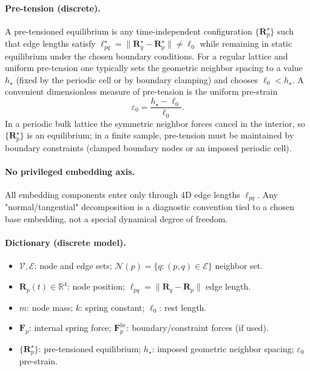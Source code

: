 \paragraph{Pre-tension (discrete).}
A pre-tensioned equilibrium is any time-independent configuration $\{\mathbf R^\star_p\}$ such that edge lengths satisfy
$\ell^\star_{pq}=\|\mathbf R^\star_q-\mathbf R^\star_p\|\neq \ell_0$ while remaining in static equilibrium under the chosen
boundary conditions. For a regular lattice and uniform pre-tension one typically sets the geometric neighbor spacing to a
value $h_\star$ (fixed by the periodic cell or by boundary clamping) and chooses $\ell_0<h_\star$. A convenient dimensionless
measure of pre-tension is the uniform pre-strain
\begin{equation}
\varepsilon_0=\frac{h_\star-\ell_0}{\ell_0}.
\label{eq:prestrain}
\end{equation}
In a periodic bulk lattice the symmetric neighbor forces cancel in the interior, so $\{\mathbf R^\star_p\}$ is an equilibrium;
in a finite sample, pre-tension must be maintained by boundary constraints (clamped boundary nodes or an imposed periodic cell).

\paragraph{No privileged embedding axis.}
All embedding components enter only through 4D edge lengths $\ell_{pq}$. Any "normal/tangential" decomposition is a diagnostic
convention tied to a chosen base embedding, not a special dynamical degree of freedom.

\paragraph{Dictionary (discrete model).}
\begin{itemize}
\item $\mathcal V,\mathcal E$: node and edge sets; $\mathcal N(p)=\{q:(p,q)\in\mathcal E\}$ neighbor set.
\item $\mathbf R_p(t)\in\mathbb R^4$: node position; $\ell_{pq}=\|\mathbf R_q-\mathbf R_p\|$ edge length.
\item $m$: node mass; $k$: spring constant; $\ell_0$: rest length.
\item $\mathbf F_p$: internal spring force; $\mathbf F^{\mathrm{bc}}_p$: boundary/constraint forces (if used).
\item $\{\mathbf R^\star_p\}$: pre-tensioned equilibrium; $h_\star$: imposed geometric neighbor spacing; $\varepsilon_0$ pre-strain.
\end{itemize}

